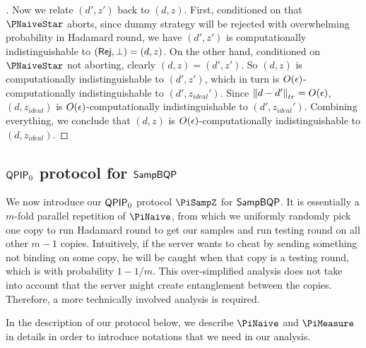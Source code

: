 \begin{proof}[]
	Now we relate $(d', z')$ back to $(d, z)$.
	First, conditioned on that $\PNaiveStar$ aborts, since dummy strategy will be rejected with overwhelming probability in Hadamard round,
	we have $(d', z')$ is computationally indistinguishable to $(\mathsf{Rej}, \bot)=(d, z)$.
	On the other hand, conditioned on $\PNaiveStar$ not aborting, clearly $(d, z)=(d', z')$.
	So $(d, z)$ is computationally indistinguishable to $(d', z')$,
	which in turn is $O(\epsilon)$-computationally indistinguishable to $(d', z_{ideal}')$.
	Since $\left\lVert d-d'\right\rVert_{tr}= O(\epsilon)$,
	 $(d, z_{ideal})$ is $O(\epsilon)$-computationally indistinguishable to $(d', z_{ideal}')$.
	Combining everything, we conclude that $(d, z)$ is $O(\epsilon)$-computationally indistinguishable to $(d, z_{ideal})$.
\end{proof}

\subsection{$\operatorname{\mathsf{QPIP}}_0$ protocol for $\operatorname{\mathsf{SampBQP}}$} \label{sec:qpip0}

We now introduce our $\operatorname{\mathsf{QPIP}}_0$ protocol $\PiSampZ$ for $\operatorname{\mathsf{SampBQP}}$.
It is essentially a $m$-fold parallel repetition of $\PiNaive$,
from which we uniformly randomly pick one copy to run Hadamard round to get our samples and run testing round on all other $m-1$ copies.
Intuitively, if the server wants to cheat by sending something not binding on some copy,
he will be caught when that copy is a testing round, which is with probability $1-1/m$.
This over-simplified analysis does not take into account that the server might create entanglement between the copies. Therefore, a more technically involved analysis is required.

In the description of our protocol below, we describe $\PiNaive$ and $\PiMeasure$ in details in order to introduce notations that we need in our analysis.

